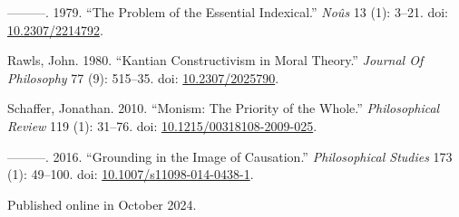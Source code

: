 \documentclass[
  10pt,
  letterpaper,
  DIV=11,
  numbers=noendperiod,
  twoside]{scrartcl}
\newlength{\cslhangindent}
\newenvironment{CSLReferences}[2] %
 {\begin{list}{}{%
  \setlength{\itemindent}{0pt}
  \setlength{\leftmargin}{0pt}
  \setlength{\parsep}{0pt}
  \ifodd #1
   \setlength{\leftmargin}{\cslhangindent}
   \setlength{\itemindent}{-1\cslhangindent}
  \fi
  \setlength{\itemsep}{#2\baselineskip}}}
 {\end{list}}
\begin{document}
\begin{CSLReferences}{1}{0}
---------. 1979. {``The Problem of the Essential Indexical.''}
\emph{Noûs} 13 (1): 3--21. doi:
\href{https://doi.org/10.2307/2214792}{10.2307/2214792}.

Rawls, John. 1980. {``Kantian Constructivism in Moral Theory.''}
\emph{Journal Of Philosophy} 77 (9): 515--35. doi:
\href{https://doi.org/10.2307/2025790}{10.2307/2025790}.

Schaffer, Jonathan. 2010. {``Monism: The Priority of the Whole.''}
\emph{Philosophical Review} 119 (1): 31--76. doi:
\href{https://doi.org/10.1215/00318108-2009-025}{10.1215/00318108-2009-025}.

---------. 2016. {``Grounding in the Image of Causation.''}
\emph{Philosophical Studies} 173 (1): 49--100. doi:
\href{https://doi.org/10.1007/s11098-014-0438-1}{10.1007/s11098-014-0438-1}.

\end{CSLReferences}



\noindent Published online in October 2024.
\end{document}
